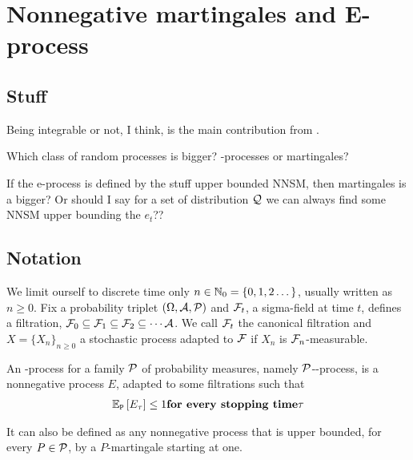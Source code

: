 \clearpage

\section{Nonnegative martingales and E-process}

\subsection{Stuff}
Being integrable or not, I think, is the main contribution from \cite{wangExtendedVillesInequality2024}.

\begin{question}
	Which class of random processes is bigger? \E-processes or martingales?
\end{question}

If the e-process is defined by the stuff upper bounded NNSM, then martingales is a bigger?
Or should I say for a set of distribution $\mathcal{Q}$ we can always find some NNSM
upper bounding the $e_t$??

\subsection{Notation}
We limit ourself to discrete time only $n\in\mathbb{N}_0=\{0,1,2\dots\}$, usually written as $n\geq 0$.
Fix a probability triplet $(\Omega,\mathcal{A},\mathcal{P})$ and $\mathcal{F}_t$, a sigma-field at time $t$, defines
a filtration, $\mathcal{F}_0\subseteq\mathcal{F}_1\subseteq\mathcal{F}_2\subseteq\cdots\mathcal{A}$.
We call $\mathcal{F}_t$ the canonical filtration and $X=\{X_n\}_{n\geq 0}$ a stochastic
process adapted to $\mathcal{F}$ if $X_n$ is $\mathcal{F}_n$-measurable.

\begin{define}
	An \E-process for a family $\mathcal{P}$ of probability measures, namely $\mathcal{P}$-\E-process,
	is a nonnegative process $E$, adapted to some filtrations such that
	\begin{align*}
		\ERWi{\Pt}{E_{\tau}} \leq 1 \qq{for every stopping time} \tau
	\end{align*}
\end{define}

It can also be defined as any nonnegative process that is upper bounded,
for every $P\in\mathcal{P}$, by a $P$-martingale starting at one.
